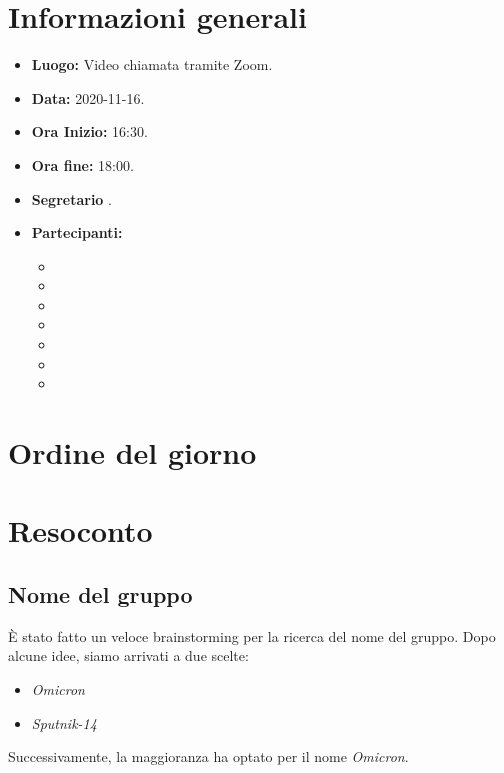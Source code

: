 \documentclass[12pt]{article}
\begin{document}
	
	
	
	
	\newpage
	\tableofcontents
	\newpage
	
	\section{Informazioni generali}
	\begin{itemize}
		\item \textbf{Luogo:} Video chiamata tramite Zoom.
		\item \textbf{Data:} 2020-11-16.
		\item \textbf{Ora Inizio:} 16:30.
		\item \textbf{Ora fine:} 18:00.
		\item \textbf{Segretario} \MB.
		\item \textbf{Partecipanti:}
		\begin{itemize}
			\item \MB
			\item \VAS
			\item \FD
			\item \NM
			\item \SB
			\item \GB
			\item \MDI
		\end{itemize}
		
	\end{itemize}
	
	\section{Ordine del giorno}	
		
	
	\newpage
	
	\section{Resoconto}
	\subsection{Nome del gruppo}
	È stato fatto un veloce brainstorming per la ricerca del nome del gruppo. Dopo alcune idee, siamo arrivati a due scelte:
	\begin{itemize}
	\item \textit{Omicron}
	\item \textit{Sputnik-14}
	\end{itemize}
	Successivamente, la maggioranza ha optato per il nome \textit{Omicron}.
	
\end{document}
